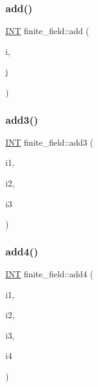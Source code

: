\mbox{\label{classfinite__field_a8f12328a27500f3c7be0c849ebbc9d14}} 
\subsubsection{\texorpdfstring{add()}{add()}}
{\footnotesize\ttfamily \mbox{\hyperlink{galois_8h_a09fddde158a3a20bd2dcadb609de11dc}{I\+NT}} finite\+\_\+field\+::add (\begin{DoxyParamCaption}\item[{\mbox{\hyperlink{galois_8h_a09fddde158a3a20bd2dcadb609de11dc}{I\+NT}}}]{i,  }\item[{\mbox{\hyperlink{galois_8h_a09fddde158a3a20bd2dcadb609de11dc}{I\+NT}}}]{j }\end{DoxyParamCaption})}

\mbox{\label{classfinite__field_aa3c53790ee7232f154fa43ebc46fb1f7}} 
\subsubsection{\texorpdfstring{add3()}{add3()}}
{\footnotesize\ttfamily \mbox{\hyperlink{galois_8h_a09fddde158a3a20bd2dcadb609de11dc}{I\+NT}} finite\+\_\+field\+::add3 (\begin{DoxyParamCaption}\item[{\mbox{\hyperlink{galois_8h_a09fddde158a3a20bd2dcadb609de11dc}{I\+NT}}}]{i1,  }\item[{\mbox{\hyperlink{galois_8h_a09fddde158a3a20bd2dcadb609de11dc}{I\+NT}}}]{i2,  }\item[{\mbox{\hyperlink{galois_8h_a09fddde158a3a20bd2dcadb609de11dc}{I\+NT}}}]{i3 }\end{DoxyParamCaption})}

\mbox{\label{classfinite__field_ac023a9f0c3890a8d2c452aaa2d157502}} 
\subsubsection{\texorpdfstring{add4()}{add4()}}
{\footnotesize\ttfamily \mbox{\hyperlink{galois_8h_a09fddde158a3a20bd2dcadb609de11dc}{I\+NT}} finite\+\_\+field\+::add4 (\begin{DoxyParamCaption}\item[{\mbox{\hyperlink{galois_8h_a09fddde158a3a20bd2dcadb609de11dc}{I\+NT}}}]{i1,  }\item[{\mbox{\hyperlink{galois_8h_a09fddde158a3a20bd2dcadb609de11dc}{I\+NT}}}]{i2,  }\item[{\mbox{\hyperlink{galois_8h_a09fddde158a3a20bd2dcadb609de11dc}{I\+NT}}}]{i3,  }\item[{\mbox{\hyperlink{galois_8h_a09fddde158a3a20bd2dcadb609de11dc}{I\+NT}}}]{i4 }\end{DoxyParamCaption})}

